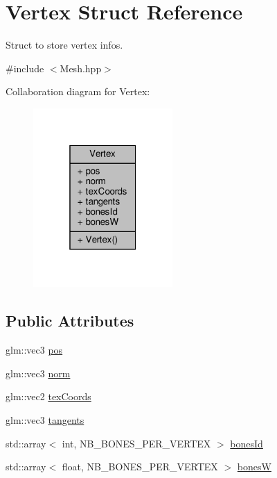 \hypertarget{struct_vertex}{}\section{Vertex Struct Reference}
\label{struct_vertex}


Struct to store vertex infos.  




{\ttfamily \#include $<$Mesh.\+hpp$>$}



Collaboration diagram for Vertex\+:
\nopagebreak
\begin{figure}[H]
\begin{center}
\leavevmode
\includegraphics[width=151pt]{struct_vertex__coll__graph}
\end{center}
\end{figure}
\subsection*{Public Attributes}
\begin{DoxyCompactItemize}
\item 
glm\+::vec3 \hyperlink{struct_vertex_a858242dc7b40c034c5e13c589b30cfb4}{pos}
\item 
glm\+::vec3 \hyperlink{struct_vertex_a70b394b12afe2e15e48535247716c160}{norm}
\item 
glm\+::vec2 \hyperlink{struct_vertex_a8d5babcf0ee1f315dae1207c375759a4}{tex\+Coords}
\item 
glm\+::vec3 \hyperlink{struct_vertex_a6e4be15c8c306b7dcd3e3d7eb1cd6b48}{tangents}
\item 
std\+::array$<$ int, N\+B\+\_\+\+B\+O\+N\+E\+S\+\_\+\+P\+E\+R\+\_\+\+V\+E\+R\+T\+EX $>$ \hyperlink{struct_vertex_a8a84e29c6a4f425c5034586c3c3d209b}{bones\+Id}
\item 
std\+::array$<$ float, N\+B\+\_\+\+B\+O\+N\+E\+S\+\_\+\+P\+E\+R\+\_\+\+V\+E\+R\+T\+EX $>$ \hyperlink{struct_vertex_a00b57e82a00d4e139c25ed4ccb8cf757}{bonesW}
\end{DoxyCompactItemize}



